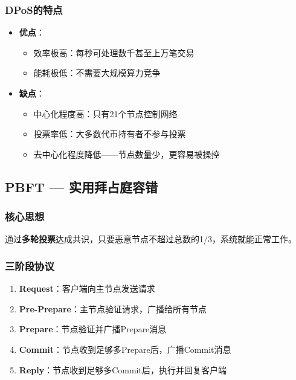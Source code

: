﻿\documentclass[12pt,a4paper]{article}
\begin{document}
\subsubsection{DPoS的特点}

\begin{itemize}[leftmargin=1.5em]
\item \textbf{优点}：
  \begin{itemize}
  \item 效率极高：每秒可处理数千甚至上万笔交易
  \item 能耗极低：不需要大规模算力竞争
  \end{itemize}
\item \textbf{缺点}：
  \begin{itemize}
  \item 中心化程度高：只有21个节点控制网络
  \item 投票率低：大多数代币持有者不参与投票
  \item 去中心化程度降低——节点数量少，更容易被操控
  \end{itemize}
\end{itemize}

\subsection{PBFT — 实用拜占庭容错}

\subsubsection{核心思想}

通过\textbf{多轮投票}达成共识，只要恶意节点不超过总数的1/3，系统就能正常工作。

\subsubsection{三阶段协议}

\begin{enumerate}[leftmargin=1.5em]
\item \textbf{Request}：客户端向主节点发送请求
\item \textbf{Pre-Prepare}：主节点验证请求，广播给所有节点
\item \textbf{Prepare}：节点验证并广播Prepare消息
\item \textbf{Commit}：节点收到足够多Prepare后，广播Commit消息
\item \textbf{Reply}：节点收到足够多Commit后，执行并回复客户端
\end{enumerate}
\end{document}
